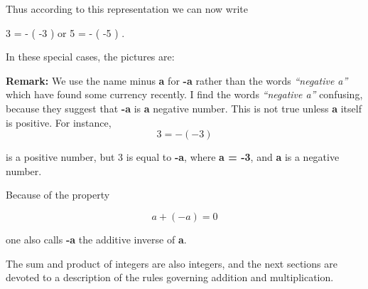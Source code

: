 \documentclass[paper=a4,oneside,fontsize=12pt, parskip=full]{scrartcl}
\begin{document}
    Thus according to this representation we can now write

    \begin{center}
        3 = - ( -3 ) or 5 = - ( -5 ) .
    \end{center}

    In these special cases, the pictures are:

    \begin{center}
    \end{center}


    \begin{center}
    \end{center}

    \textbf{Remark:} We use the name minus \textbf{a} for \textbf{-a} rather than the words \textit{“negative a”}
    which have found some currency recently.
    I find the words \textit{“negative a”} confusing, because they suggest that \textbf{-a} is \textbf{a} negative number.
    This is not true unless \textbf{a} itself is positive.
    For instance,
    \[3 = -(-3)\]

    is a positive number, but 3 is equal to \textbf{-a}, where \textbf{a = -3}, and \textbf{a} is a negative number.

    Because of the property

    \[a + ( -a ) = 0\]

    one also calls \textbf{-a} the additive inverse of \textbf{a}.

    The sum and product of integers are also integers, and the next sections
    are devoted to a description of the rules governing addition and multiplication.
\end{document}
